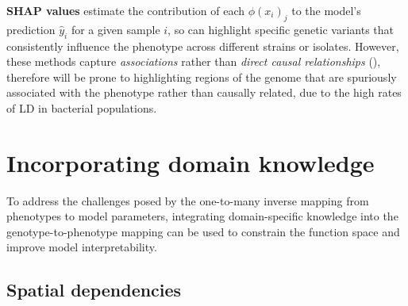 \documentclass[12pt]{article}
\begin{document}
\textbf{SHAP values} estimate the contribution of each $\phi(x_i)_j$ to the model's prediction $\hat{y}_i$ for a given sample $i$, so can highlight specific genetic variants that consistently influence the phenotype across different strains or isolates. However, these methods capture \textit{associations} rather than \textit{direct causal relationships} (\cite{ma2020predictive}), therefore will be prone to highlighting regions of the genome that are spuriously associated with the phenotype rather than causally related, due to the high rates of LD in bacterial populations.



\section{Incorporating domain knowledge}



To address the challenges posed by the one-to-many inverse mapping from phenotypes to model parameters, integrating domain-specific knowledge into the genotype-to-phenotype mapping can be used to constrain the function space and improve model interpretability.




\subsection{Spatial dependencies}
\end{document}
